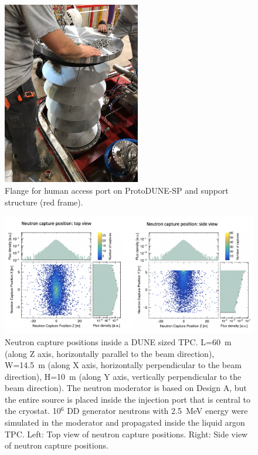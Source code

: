 \begin{figure}[tpb]
\centering
\includegraphics[width=6cm]{graphics/manhole2.jpg}
\caption{Flange for human access port on ProtoDUNE-SP and support structure (red frame).}
\label{fig:humanaccessport}
\end{figure} 

\begin{figure}[tpb]
\centering
\includegraphics[width=18cm]{graphics/PNS_NcapPosition.png}
\caption{Neutron capture positions inside a DUNE sized TPC. L=60~m (along Z axis, horizontally parallel to the beam direction), W=14.5~m (along X axis, horizontally perpendicular to the beam direction), H=10~m (along Y axis, vertically perpendicular to the beam direction). The neutron moderator is based on Design A, but the entire source is placed inside the injection port that is central to the cryostat. 10$^{6}$ DD generator neutrons with 2.5~MeV energy were simulated in the moderator and propagated inside the liquid argon TPC. Left: Top view of neutron capture positions. Right: Side view of neutron capture positions.} 
\label{fig:ncapposition}
\end{figure} 

